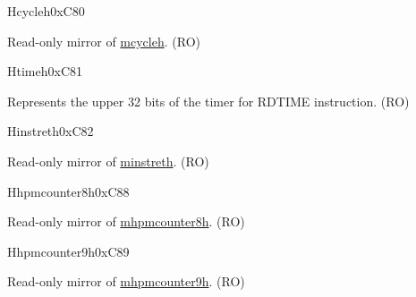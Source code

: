 \begin{register}{H}{cycleh}{0xC80}\label{regdesc:CYCLEH}
%
\regnewline%
\begin{regdesc}\begin{reglist}
\label{fielddesc:CYCLEH}\item [CYCLEH] Read-only mirror of \hyperref[regdesc:MCYCLEH]{mcycleh}. (RO)
\end{reglist}\end{regdesc}
\end{register}

\begin{register}{H}{timeh}{0xC81}\label{regdesc:TIMEH}
%
\regnewline%
\begin{regdesc}\begin{reglist}
\label{fielddesc:TIMEH}\item [TIMEH] Represents the upper 32 bits of the timer for RDTIME instruction. (RO)
\end{reglist}\end{regdesc}
\end{register}

\begin{register}{H}{instreth}{0xC82}\label{regdesc:INSTRETH}
%
\regnewline%
\begin{regdesc}\begin{reglist}
\label{fielddesc:INSTRETH}\item [INSTRETH] Read-only mirror of \hyperref[regdesc:MINSTRETH]{minstreth}. (RO)
\end{reglist}\end{regdesc}
\end{register}

\begin{register}{H}{hpmcounter8h}{0xC88}\label{regdesc:HPMCOUNTER8H}
%
\regnewline%
\begin{regdesc}\begin{reglist}
\label{fielddesc:HPMCOUNTER8H}\item [HPMCOUNTER8H] Read-only mirror of \hyperref[regdesc:MHPMCOUNTER8H]{mhpmcounter8h}. (RO)
\end{reglist}\end{regdesc}
\end{register}

\begin{register}{H}{hpmcounter9h}{0xC89}\label{regdesc:HPMCOUNTER9H}
%
\regnewline%
\begin{regdesc}\begin{reglist}
\label{fielddesc:HPMCOUNTER9H}\item [HPMCOUNTER9H] Read-only mirror of \hyperref[regdesc:MHPMCOUNTER9H]{mhpmcounter9h}.  (RO)
\end{reglist}\end{regdesc}
\end{register}


